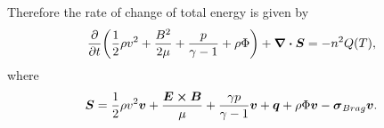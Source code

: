 Therefore the rate of change of total energy is given by
\begin{equation}
    \pdv{}{t}\qty(\frac{1}{2}\rho v^2 + \frac{B^2}{2\mu}+\frac{p}{\gamma-1}+\rho\Phi)+\div{\boldsymbol{S}}=-n^2Q(T),
\end{equation}
where
\begin{equation}
    \boldsymbol{S} = \frac{1}{2}\rho v^2\boldsymbol{v} + \frac{\boldsymbol{E}\cross\boldsymbol{B}}{\mu} + \frac{\gamma p}{\gamma - 1}\boldsymbol{v} + \boldsymbol{q} + \rho\Phi\boldsymbol{v} - \boldsymbol{\sigma}_{Brag}\boldsymbol{v}.
\end{equation}






